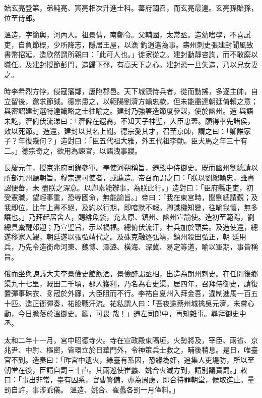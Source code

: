 \begin{pinyinscope}
 始玄亮登第，弟純亮、寅亮相次升進士科。蕃府闢召，而玄亮最達。玄亮孫貽孫，位至侍郎。



 溫造，字簡輿，河內人。祖景倩，南鄭令。父輔國，太常丞。造幼嗜學，不喜試吏，自負節概，少所降志，隱居王屋，以漁
 釣逍遙為事。壽州刺史張建封聞風致書幣招延，造欣然謂所親曰：「此可人也。」徙家從之。建封動靜咨詢，而不敢縻以職任。及建封授節彭門，造歸下邳，有高天下之心。建封恐一旦失造，乃以兄女妻之。



 時李希烈方悖，侵寇籓鄰，屢陷郡邑。天下城鎮恃兵者，從而動搖，多逐主帥，自立留後，邀求節鉞。德宗患之，以範陽劉濟方輸忠款，但未能盡達朝廷倚賴之意；與密詔建封選特達識略之士往喻之。建封乃強署造節度參謀，使於幽州。造
 與語未訖，濟俯伏流涕曰：「濟僻在遐裔，不知天子神聖，大臣忠藎。願得率先諸侯，效以死節。」造還，建封以其名上聞。德宗愛其才，召至京師，謂之曰：「卿誰家子？年復幾何？」造對曰：「臣五代祖大雅，外五代祖李勣。臣犬馬之年三十有二。」德宗奇之，欲用為諫官，以語洩事寢。



 長慶元年，授京兆府司錄參軍。奉使河朔稱旨，遷殿中侍御史。既而幽州劉總請以所部九州聽朝旨。穆宗選可使者，或薦造。帝召而謂之曰：「朕以劉總輸忠，雖書詔便蕃，未
 盡朕之深意。以卿素能辦事，為朕此行。」造對曰：「臣府縣走吏，初受憲職，望輕事重，恐辱國命，無能諭旨。」帝曰：「我在東宮時，聞劉總請覲；及我即位，比年上書不絕，及約以行期，即喑默不報。卿識機知變，往喻我懷，無多讓也。」乃拜起居舍人，賜緋魚袋，充太原、鎮州、幽州宣諭使。造初至範陽，劉總具櫜鞬郊迎；乃宣聖旨，示以禍福。總俯伏流汗，若兵加於頸矣。及造使還，總遂移家入覲，朝廷遂以張弘靖代之。及硃克融逐弘靖，鎮州殺田弘正，朝
 廷用兵，乃先令造銜命河東、魏博、澤潞、橫海、深冀、易定等道，喻以軍期，事皆稱旨。



 俄而坐與諫議大夫李景儉史館飲酒，景儉醉謁丞相，出造為朗州刺史。在任開後鄉渠九十七里，溉田二千頃，郡人獲利，乃名為右史渠。居四年，召拜侍御史，請復置彈事硃衣、豸冠於外廊，大臣阻而不行。李祐自夏州入拜金吾，違制進馬一百五十匹。造正衙彈奏，祐股戰汗流。祐私謂人曰：「吾夜逾蔡州城擒吳元濟，未嘗心動，今日膽落於溫御史。籲，可畏
 哉！」遷左司郎中，再知雜事。尋拜御史中丞。



 太和二年十一月，宮中昭德寺火。寺在宣政殿東隔垣，火勢將及，宰臣、兩省、京兆尹、中尉、樞密，皆環立於日華門外，令神策兵士救之，晡後稍息。是日，唯臺官不到。造奏曰：「昨宮中遺火，緣臺有系囚，恐緣為奸，追集人吏堤防，所以至朝堂在後，臣請自罰三十直。其兩巡使崔蠡、姚合火滅方到，請別議責罰。」敕曰：「事出非常，臺有囚系，官曹警備，亦為周慮，即合待罪朝堂，候取進止。量罰自許，事涉乖儀。
 溫造、姚合、崔蠡各罰一月俸料。」




\end{pinyinscope}

